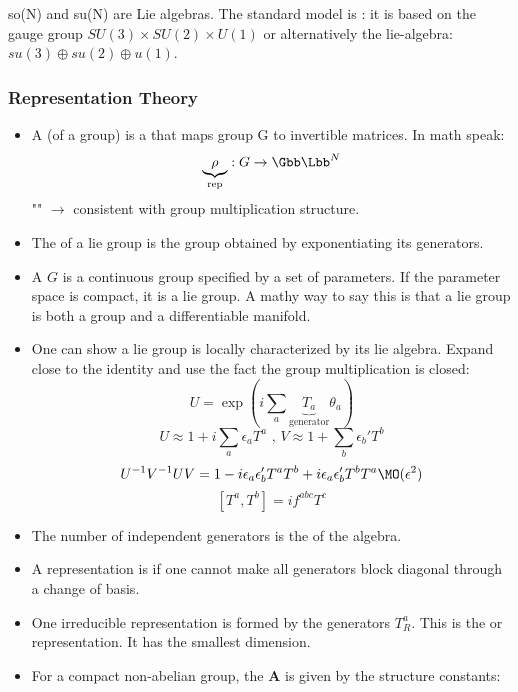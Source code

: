 \documentclass[11pt]{scrartcl}
\begin{document}
\begin{example}
	so(N) and su(N) are  Lie algebras.  The standard model is : it is based on the gauge group $SU(3) \times SU(2) \times U(1)$ or alternatively the lie-algebra:
	$su(3) \oplus su(2) \oplus u(1)$.
\end{example}

\subsubsection{Representation Theory}

\begin{itemize}
	\item A  (of a group) is a  that maps group G to invertible matrices.  In math speak:
	\[ \underbrace{\rho}_{\text{rep}}: G \rightarrow \Gbb \Lbb^N \] "" $\rightarrow$ consistent with group multiplication structure.
	\item The  of a lie group is the group obtained by exponentiating its generators. 
	\item A  $G$ is a continuous group specified by a set of parameters.  If the parameter space is compact, it is a  lie group.  A mathy way to say this is that a lie group is both a group and a differentiable manifold.
	\item One can show a lie group is locally characterized by its lie algebra.  Expand close to the identity and use the fact the group multiplication is closed:
	\[U = \exp \left(i \sum_a \underbrace{T_a}_{\text{generator}} \theta_a \right)\]
	\[ U \approx 1 + i \sum_a \epsilon_a T^a \text{ ,   } V \approx 1 + \sum_b \epsilon_b' T^b \]
	\[ U^{-1} V^{-1} UV  = 1 - i \epsilon_a \epsilon_b' T^a T^b + i \epsilon_a \epsilon_b' T^{b} T^{a}\MO(\epsilon^2)  \]
	\[ [T^a, T^b] = i f^{abc} T^c \]
	\item The number of independent generators is the  of the algebra.
	\item A representation is  if one cannot make all generators block diagonal through a change of basis. 
	\item One irreducible representation is formed by the generators $T_R^a$. This is the  or  representation.  It has the smallest dimension.
	\item For a compact non-abelian group, the  \textbf{A} is given by the structure constants:

\end{itemize}
\end{document}
